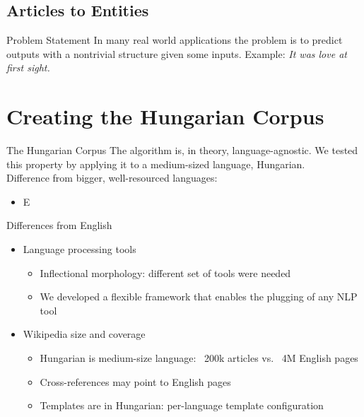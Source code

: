 \documentclass[utf8x]{beamer}
\newcommand{\vitem}{\vfill \item}
\begin{document}
\subsection{Articles to Entities}
\begin{frame}{Problem Statement}
  In many real world applications the problem is to predict outputs with a nontrivial structure given some inputs.
  \vfill
  Example: \textit{\small It was love at first sight.}
  \vfill
\end{frame}

\section{Creating the Hungarian Corpus}

\begin{frame}{The Hungarian Corpus}
  The algorithm is, in theory, language-agnostic. We tested this property by
  applying it to a medium-sized language, Hungarian. \\
  Difference from bigger, well-resourced languages:
  \begin{itemize}
  \vitem E %
  \end{itemize}
\end{frame}

\begin{frame}{Differences from English}
  \begin{itemize}
  \vitem Language processing tools
    \begin{itemize}
    \vitem Inflectional morphology: different set of tools were needed 
    \vitem We developed a flexible framework that enables the plugging of any NLP tool
    \end{itemize}
  \vitem Wikipedia size and coverage
    \begin{itemize}
    \vitem Hungarian is medium-size language: ~200k articles vs. ~4M English pages
    \vitem Cross-references may point to English pages
    \vitem Templates are in Hungarian: per-language template configuration
    \end{itemize}
  \end{itemize}
\end{frame}
\end{document}
